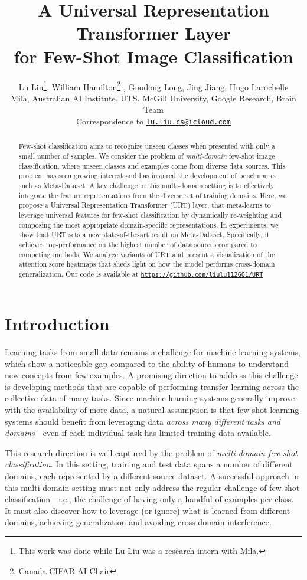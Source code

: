\documentclass{article}
\title{A Universal Representation Transformer Layer\\ for Few-Shot Image Classification}
\author{Lu Liu\thanks{This work was done while Lu Liu was a research intern with Mila.}, William Hamilton\thanks{Canada CIFAR AI Chair} , Guodong Long, Jing Jiang, Hugo Larochelle \\
 Mila,  Australian AI Institute, UTS,  McGill University,   Google Research, Brain Team\\
  Correspondence to \texttt{\href{mailto:lu.liu.cs@icloud.com}{lu.liu.cs@icloud.com}}
}
\begin{document}
\maketitle

\begin{abstract}
Few-shot classification aims to recognize unseen classes when presented with only a small number of samples. 
We consider the problem of {\em multi-domain} few-shot image classification, where unseen classes and examples come from diverse data sources. This problem has seen growing interest and has inspired the development of benchmarks such as Meta-Dataset. A key challenge in this multi-domain setting is to effectively integrate the feature representations from the diverse set of training domains.
Here, we propose a Universal Representation Transformer (URT) layer, that meta-learns to leverage universal features for few-shot classification by dynamically re-weighting and composing the most appropriate domain-specific representations.
In experiments, we show that URT sets a new state-of-the-art result on Meta-Dataset. 
Specifically, it achieves top-performance on the highest number of data sources compared to competing methods.
We analyze variants of URT and present a visualization of the attention score heatmaps that sheds light on how the model performs cross-domain generalization. Our code is available at \texttt{\href{https://github.com/liulu112601/URT}{https://github.com/liulu112601/URT}}
\end{abstract}


\section{Introduction}


Learning tasks from small data remains a challenge for machine learning systems, which show a noticeable gap compared to the ability of humans to understand new concepts from few examples. A promising direction to address this challenge is developing methods that are capable of performing transfer learning across the collective data of many tasks. 
Since machine learning systems generally improve with the availability of more data, a natural assumption is that few-shot learning systems should benefit from leveraging data {\em across many different tasks and domains}---even if each individual task has limited training data available. 


This research direction is well captured by the problem of {\em multi-domain few-shot classification}. 
In this setting, training and test data spans a number of different domains, each represented by a different source dataset. 
A successful approach in this multi-domain setting must not only address the regular challenge of few-shot classification---i.e., the challenge of having only a handful of examples per class. 
It must also discover how to leverage (or ignore) what is learned from different domains, achieving generalization and avoiding cross-domain interference. 
\end{document}

